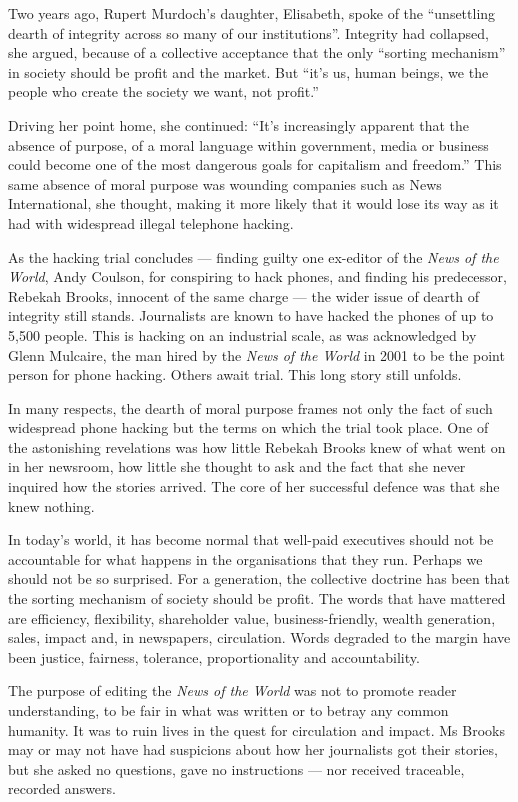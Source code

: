 \documentclass[UTF8,11pt]{ctexart}
\begin{document}
Two years ago, Rupert Murdoch’s daughter, Elisabeth, spoke of the “unsettling dearth of integrity across so many of our institutions”. Integrity had collapsed, she argued, because of a collective acceptance that the only “sorting mechanism” in society should be profit and the market. But “it’s us, human beings, we the people who create the society we want, not profit.”


Driving her point home, she continued: “It’s increasingly apparent that the absence of purpose, of a moral language within government, media or business could become one of the most dangerous goals for capitalism and freedom.” This same absence of moral purpose was wounding companies such as News International, she thought, making it more likely that it would lose its way as it had with widespread illegal telephone hacking.


As the hacking trial concludes — finding guilty one ex-editor of the \textit{News of the World}, Andy Coulson, for conspiring to hack phones, and finding his predecessor, Rebekah Brooks, innocent of the same charge — the wider issue of dearth of integrity still stands. Journalists are known to have hacked the phones of up to 5,500 people. This is hacking on an industrial scale, as was acknowledged by Glenn Mulcaire, the man hired by the \textit{News of the World} in 2001 to be the point person for phone hacking. Others await trial. This long story still unfolds.


In many respects, the dearth of moral purpose frames not only the fact of such widespread phone hacking but the terms on which the trial took place. One of the astonishing revelations was how little Rebekah Brooks knew of what went on in her newsroom, how little she thought to ask and the fact that she never inquired how the stories arrived. The core of her successful defence was that she knew nothing.


In today’s world, it has become normal that well-paid executives should not be accountable for what happens in the organisations that they run. Perhaps we should not be so surprised. For a generation, the collective doctrine has been that the sorting mechanism of society should be profit. The words that have mattered are efficiency, flexibility, shareholder value, business-friendly, wealth generation, sales, impact and, in newspapers, circulation. Words degraded to the margin have been justice, fairness, tolerance, proportionality and accountability.


The purpose of editing the \textit{News of the World} was not to promote reader understanding, to be fair in what was written or to betray any common humanity. It was to ruin lives in the quest for circulation and impact. Ms Brooks may or may not have had suspicions about how her journalists got their stories, but she asked no questions, gave no instructions — nor received traceable, recorded answers.
\end{document}
